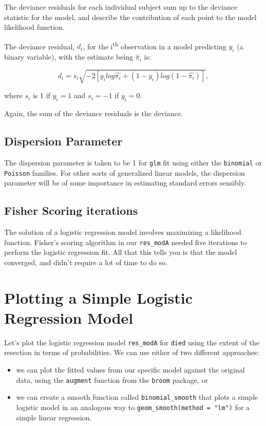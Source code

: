 \documentclass[]{book}
\providecommand{\tightlist}{%
  \setlength{\itemsep}{0pt}\setlength{\parskip}{0pt}}
\theoremstyle{definition}
\theoremstyle{definition}
\theoremstyle{definition}
\theoremstyle{remark}
\begin{document}
The deviance residuals for each individual subject sum up to the
deviance statistic for the model, and describe the contribution of each
point to the model likelihood function.

The deviance residual, \(d_i\), for the i\textsuperscript{th}
observation in a model predicting \(y_i\) (a binary variable), with the
estimate being \(\hat{\pi}_i\) is:

\[
d_i = s_i \sqrt{-2 [y_i log \hat{\pi_i} + (1 - y_i) log(1 - \hat{\pi_i})]},
\]

where \(s_i\) is 1 if \(y_i = 1\) and \(s_i = -1\) if \(y_i = 0\).

Again, the sum of the deviance residuals is the deviance.

\subsection{Dispersion Parameter}\label{dispersion-parameter}

The dispersion parameter is taken to be 1 for \texttt{glm} fit using
either the \texttt{binomial} or \texttt{Poisson} families. For other
sorts of generalized linear models, the dispersion parameter will be of
some importance in estimating standard errors sensibly.

\subsection{Fisher Scoring iterations}\label{fisher-scoring-iterations}

The solution of a logistic regression model involves maximizing a
likelihood function. Fisher's scoring algorithm in our
\texttt{res\_modA} needed five iterations to perform the logistic
regression fit. All that this tells you is that the model converged, and
didn't require a lot of time to do so.

\section{Plotting a Simple Logistic Regression
Model}\label{plotting-a-simple-logistic-regression-model}

Let's plot the logistic regression model \texttt{res\_modA} for
\texttt{died} using the extent of the resection in terms of
probabilities. We can use either of two different approaches:

\begin{itemize}
\tightlist
\item
  we can plot the fitted values from our specific model against the
  original data, using the \texttt{augment} function from the
  \texttt{broom} package, or
\item
  we can create a smooth function called \texttt{binomial\_smooth} that
  plots a simple logistic model in an analogous way to
  \texttt{geom\_smooth(method\ =\ "lm")} for a simple linear regression.
\end{itemize}
\end{document}
